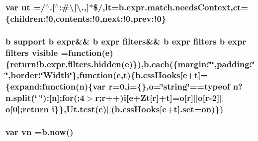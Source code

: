 \hypertarget{jquery-1_89_81_8min_8js_af1b289c03d72c135e55c1b86f834ab42}{
\subsubsection[{ut}]{\setlength{\rightskip}{0pt plus 5cm}var ut =/$^\wedge$.\mbox{[}$^\wedge$\-:\#\textbackslash{}\mbox{[}\textbackslash{}.,\mbox{]}$\ast$\$/,{\bf lt}=b.\-expr.\-match.\-needs\-Context,{\bf ct}=\{children\-:!0,contents\-:!0,next\-:!0,prev\-:!0\}}}\label{jquery-1_89_81_8min_8js_af1b289c03d72c135e55c1b86f834ab42}
\hypertarget{jquery-1_89_81_8min_8js_ad880ea6f97fc7676453d0b5248d5770b}{
\subsubsection[{visible}]{ {\bf b} support {\bf b} {\bf expr}\&\& {\bf b} {\bf expr} {\bf filters}\&\& {\bf b} {\bf expr} {\bf filters} {\bf b} {\bf expr} {\bf filters} visible =function({\bf e})\{{\bf return!b.\-expr.\-filters.\-hidden}({\bf e})\}),{\bf b.\-each}(\{margin\-:\char`\"{}\char`\"{},padding\-:\char`\"{}\char`\"{},border\-:\char`\"{}Width\char`\"{}\},function({\bf e},{\bf t})\{b.\-css\-Hooks\mbox{[}{\bf e}+{\bf t}\mbox{]}=\{expand\-:function({\bf n})\{var {\bf r}=0,{\bf i}=\{\},{\bf o}=\char`\"{}string\char`\"{}==typeof {\bf n}?n.\-split(\char`\"{} \char`\"{})\-:\mbox{[}{\bf n}\mbox{]};{\bf for}(;4$>${\bf r};{\bf r}++){\bf i}\mbox{[}{\bf e}+Zt\mbox{[}{\bf r}\mbox{]}+{\bf t}\mbox{]}={\bf o}\mbox{[}{\bf r}\mbox{]}$\vert$$\vert${\bf o}\mbox{[}{\bf r}-\/2\mbox{]}$\vert$$\vert${\bf o}\mbox{[}0\mbox{]};return {\bf i}\}\},Ut.\-test({\bf e})$\vert$$\vert$(b.\-css\-Hooks\mbox{[}{\bf e}+{\bf t}\mbox{]}.set={\bf on})\})}}\label{jquery-1_89_81_8min_8js_ad880ea6f97fc7676453d0b5248d5770b}
\hypertarget{jquery-1_89_81_8min_8js_a4d3ea42bab8c1a36105c29b5a098a050}{
\subsubsection[{vn}]{\setlength{\rightskip}{0pt plus 5cm}var vn =b.\-now()}}\label{jquery-1_89_81_8min_8js_a4d3ea42bab8c1a36105c29b5a098a050}
